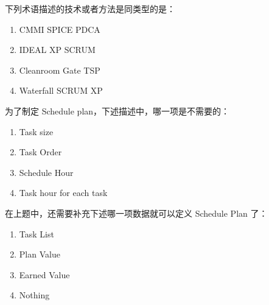 \begin{problem}
	下列术语描述的技术或者方法是同类型的是：
    \vspace{-0.8em}
    \begin{multicols}{2}
        \begin{enumerate}[label=\Alph*.]
            \item CMMI SPICE PDCA
            \item IDEAL XP SCRUM
            \item Cleanroom Gate TSP
            \item Waterfall SCRUM XP
        \end{enumerate}
    \end{multicols}
    \vspace{-1em}
\end{problem}



\begin{problem}
	为了制定 Schedule plan，下述描述中，哪一项是不需要的：
    \vspace{-0.8em}
    \begin{multicols}{2}
        \begin{enumerate}[label=\Alph*.]
            \item Task size
            \item Task Order
            \item Schedule Hour
            \item Task hour for each task
        \end{enumerate}
    \end{multicols}
    \vspace{-1em}
\end{problem}




\begin{problem}
	在上题中，还需要补充下述哪一项数据就可以定义 Schedule Plan 了：
    \vspace{-0.8em}
    \begin{multicols}{4}
        \begin{enumerate}[label=\Alph*.]
            \item Task List
            \item Plan Value
            \item Earned Value
            \item Nothing
        \end{enumerate}
    \end{multicols}
    \vspace{-1em}
\end{problem}


